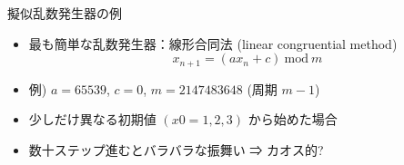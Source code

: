 \begin{frame}[t,fragile]{擬似乱数発生器の例}
  \begin{itemize}
  \item 最も簡単な乱数発生器：線形合同法 (linear congruential method)
    \[
    x_{n+1} = (ax_n+c) \ \mbox{mod} \ m
    \]
  \item 例) $a = 65539$, $c = 0$, $m = 2147483648$ (周期 $m-1$)
  \item 少しだけ異なる初期値 $(x0 = 1, 2, 3)$ から始めた場合
  \item 数十ステップ進むとバラバラな振舞い ⇒ カオス的?
  \end{itemize}
\end{frame}

